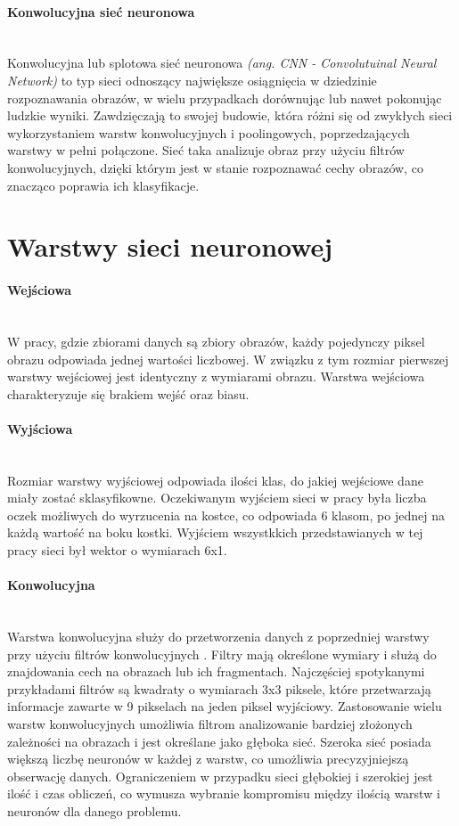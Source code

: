 \paragraph{Konwolucyjna sieć neuronowa} \mbox{}\\
Konwolucyjna lub splotowa sieć neuronowa \textit{(ang. CNN - Convolutuinal Neural Network)}
to typ sieci odnoszący największe osiągnięcia w dziedzinie rozpoznawania obrazów,
w wielu przypadkach dorównując lub nawet pokonując ludzkie wyniki. Zawdzięczają to
swojej budowie, która różni się od zwykłych sieci wykorzystaniem warstw konwolucyjnych
i poolingowych, poprzedzających warstwy w pełni połączone. Sieć taka analizuje obraz
przy użyciu filtrów konwolucyjnych, dzięki którym jest w stanie rozpoznawać cechy
obrazów, co znacząco poprawia ich klasyfikacje.

\section{Warstwy sieci neuronowej}
\paragraph{Wejściowa} \mbox{}\\
W pracy, gdzie zbiorami danych są zbiory obrazów, każdy pojedynczy piksel obrazu
odpowiada jednej wartości liczbowej. W związku z tym rozmiar pierwszej warstwy
wejściowej jest identyczny z wymiarami obrazu. Warstwa wejściowa charakteryzuje się
brakiem wejść oraz biasu.

\paragraph{Wyjściowa} \mbox{}\\
Rozmiar warstwy wyjściowej odpowiada ilości klas, do jakiej wejściowe dane miały
zostać sklasyfikowne. Oczekiwanym wyjściem sieci w pracy była liczba oczek możliwych
do wyrzucenia na kostce, co odpowiada 6 klasom, po jednej na każdą wartość na boku
kostki. Wyjściem wszystkkich przedstawianych w tej pracy sieci był wektor o wymiarach
6x1.

\paragraph{Konwolucyjna} \mbox{}\\
Warstwa konwolucyjna służy do przetworzenia danych z poprzedniej warstwy przy użyciu
filtrów konwolucyjnych \cite{CS231n}. Filtry mają określone wymiary i służą do znajdowania cech
na obrazach lub ich fragmentach. Najczęściej spotykanymi przykładami filtrów są
kwadraty o wymiarach 3x3 piksele, które przetwarzają informacje zawarte w 9 pikselach
na jeden piksel wyjściowy.
Zastosowanie wielu warstw konwolucyjnych umożliwia filtrom analizowanie bardziej złożonych
zależności na obrazach i jest określane jako głęboka sieć. Szeroka sieć posiada większą
liczbę neuronów w każdej z warstw, co umożliwia precyzyjniejszą obserwację danych.
Ograniczeniem w przypadku sieci głębokiej i szerokiej jest ilość i czas obliczeń, co
wymusza wybranie kompromisu między ilością warstw i neuronów dla danego problemu.

